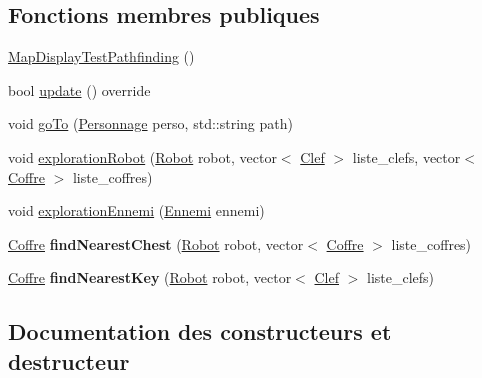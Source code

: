 \subsection*{Fonctions membres publiques}
\begin{DoxyCompactItemize}
\item 
\hyperlink{classMapDisplayTestPathfinding_a97c5acec6743b1099a6e6827e0b77a78}{Map\+Display\+Test\+Pathfinding} ()
\item 
bool \hyperlink{classMapDisplayTestPathfinding_a1286ccf10d21d40419ec5c900d3998f3}{update} () override
\item 
void \hyperlink{classMapDisplayTestPathfinding_acf7f5c72f302fa74bdee6702d497307b}{go\+To} (\hyperlink{classPersonnage}{Personnage} perso, std\+::string path)
\item 
void \hyperlink{classMapDisplayTestPathfinding_a544fd59caaae448044c21c8423da9a31}{exploration\+Robot} (\hyperlink{classRobot}{Robot} robot, vector$<$ \hyperlink{classClef}{Clef} $>$ liste\+\_\+clefs, vector$<$ \hyperlink{classCoffre}{Coffre} $>$ liste\+\_\+coffres)
\item 
void \hyperlink{classMapDisplayTestPathfinding_a04dc1aac567305afdd7ca99255127677}{exploration\+Ennemi} (\hyperlink{classEnnemi}{Ennemi} ennemi)
\item 
\hypertarget{classMapDisplayTestPathfinding_aea2d2a8e916ce118217a5ee0b9ff47eb}{}\hyperlink{classCoffre}{Coffre} {\bfseries find\+Nearest\+Chest} (\hyperlink{classRobot}{Robot} robot, vector$<$ \hyperlink{classCoffre}{Coffre} $>$ liste\+\_\+coffres)\label{classMapDisplayTestPathfinding_aea2d2a8e916ce118217a5ee0b9ff47eb}

\item 
\hypertarget{classMapDisplayTestPathfinding_abefa4a37705752a473e412fb2ce6112b}{}\hyperlink{classCoffre}{Coffre} {\bfseries find\+Nearest\+Key} (\hyperlink{classRobot}{Robot} robot, vector$<$ \hyperlink{classClef}{Clef} $>$ liste\+\_\+clefs)\label{classMapDisplayTestPathfinding_abefa4a37705752a473e412fb2ce6112b}

\end{DoxyCompactItemize}


\subsection{Documentation des constructeurs et destructeur}
\hypertarget{classMapDisplayTestPathfinding_a97c5acec6743b1099a6e6827e0b77a78}{}
